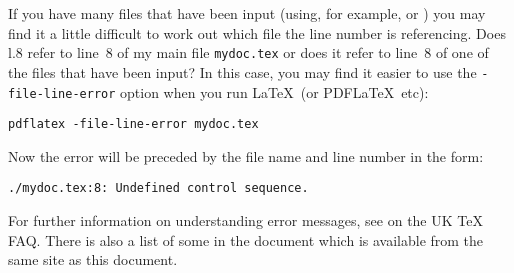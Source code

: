 If you have many files that have been input (using, for example,
 or ) you may find it a little difficult to
work out which file the line number is referencing. Does l.8 refer
to line~8 of my main file \texttt{mydoc.tex} or does it refer to
line~8 of one of the files that have been input? In this case, you
may find it easier to use the \texttt{-file-line-error} option when
you run \LaTeX\ (or PDF\LaTeX\ etc):
\begin{verbatim}
pdflatex -file-line-error mydoc.tex
\end{verbatim}
Now the error will be preceded by the file name and line number in
the form:
\begin{verbatim}
./mydoc.tex:8: Undefined control sequence.
\end{verbatim}

For further information on understanding error messages, see
 on the UK TeX FAQ. There is also a list of some
in the document 
which is available from the same site as this document. 




